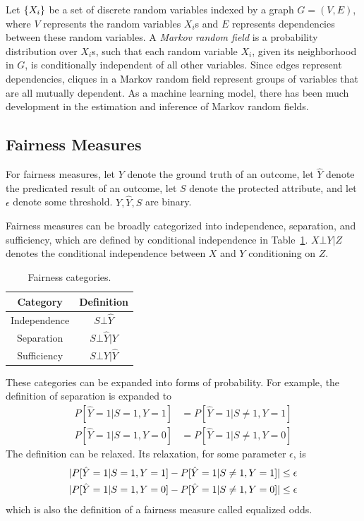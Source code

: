 \documentclass[manuscript,screen,review,anonymous]{acmart}
\DeclarePairedDelimiter{\set}{\{}{\}}
\DeclarePairedDelimiter{\abs}{\lvert}{\rvert}
\begin{document}
Let $\set{X_i}$ be a set of discrete random variables indexed by a graph $G = (V,E)$, where $V$ represents the random variables $X_i$s and $E$ represents dependencies between these random variables. A \emph{Markov random field} is a probability distribution over $X_i$s, such that each random variable $X_i$, given its neighborhood in $G$, is conditionally independent of all other variables. Since edges represent dependencies, cliques in a Markov random field represent groups of variables that are all mutually dependent. As a machine learning model, there has been much development in the estimation and inference of Markov random fields\cite{koller2009probabilistic,murphy2023probabilistic}.

\subsection{Fairness Measures}

For fairness measures\cite{yuan2024ensuring,pessach2022review}, let $Y$ denote the ground truth of an outcome, let $\hat{Y}$ denote the predicated result of an outcome, let $S$ denote the protected attribute, and let $\epsilon$ denote some threshold. $Y, \hat{Y}, S$ are binary.

Fairness measures can be broadly categorized into independence, separation, and sufficiency, which are defined by conditional independence in Table~\ref{tab:categories}. $X \bot Y | Z$ denotes the conditional independence between $X$ and $Y$ conditioning on $Z$.

\begin{table}[h]
\caption{Fairness categories.}
\label{tab:categories}
\begin{tabular}{cc}
\toprule
\textbf{Category} & \textbf{Definition} \\
\midrule
Independence & $S \bot \hat{Y}$ \\
Separation & $S \bot \hat{Y} | Y$ \\
Sufficiency & $S \bot Y | \hat{Y}$ \\
\bottomrule
\end{tabular}
\end{table}

These categories can be expanded into forms of probability. For example, the definition of separation is expanded to
\begin{align*}
P[\hat{Y} = 1 | S = 1, Y = 1] & = P[\hat{Y} = 1 | S \neq 1, Y = 1] \\
P[\hat{Y} = 1 | S = 1, Y = 0] & = P[\hat{Y} = 1 | S \neq 1, Y = 0]
\end{align*}
The definition can be relaxed. Its relaxation, for some parameter $\epsilon$, is
\begin{align*}
\abs{P[\hat{Y} = 1 | S = 1, Y = 1] - P[\hat{Y} = 1 | S \neq 1, Y = 1]} & \leq \epsilon \\
\abs{P[\hat{Y} = 1 | S = 1, Y = 0] - P[\hat{Y} = 1 | S \neq 1, Y = 0]} & \leq \epsilon
\end{align*}
which is also the definition of a fairness measure called equalized odds.
\end{document}
